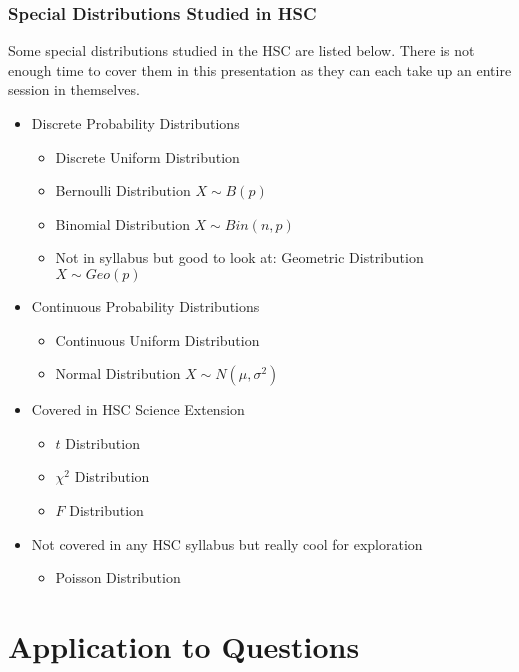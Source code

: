 \documentclass{beamer}
\begin{document}
\begin{frame}
  \frametitle{Special Distributions Studied in HSC}
  Some special distributions studied in the HSC are listed below. There is not enough time to cover them in this presentation as they can each take up an entire session in themselves.
  \begin{itemize}
    \item<1-> Discrete Probability Distributions
      \begin{itemize}
        \item<2-> Discrete Uniform Distribution
        \item<3-> Bernoulli Distribution $X \sim B(p)$
        \item<4-> Binomial Distribution $X \sim Bin(n,p)$
        \item<5-> Not in syllabus but good to look at: Geometric Distribution $X \sim Geo(p)$
      \end{itemize}
    \item<6-> Continuous Probability Distributions
      \begin{itemize}
        \item<7-> Continuous Uniform Distribution
        \item<8-> Normal Distribution $X \sim N(\mu, \sigma^2)$
      \end{itemize}
    \item<9-> Covered in HSC Science Extension
      \begin{itemize}
        \item<9-> $t$ Distribution
        \item<9-> $\chi^2$ Distribution
        \item<9-> $F$ Distribution
      \end{itemize}
    \item<9-> Not covered in any HSC syllabus but really cool for exploration
      \begin{itemize}
        \item<9-> Poisson Distribution
      \end{itemize}
  \end{itemize}
\end{frame}


\section{Application to Questions}
\end{document}
